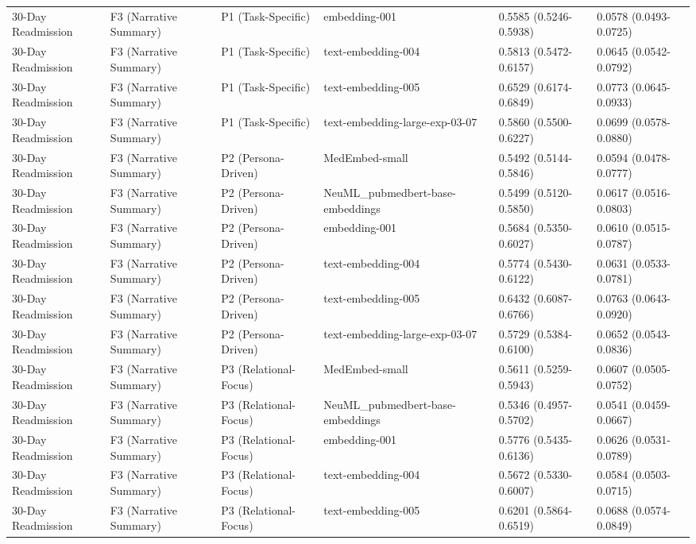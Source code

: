\begin{tabular}{llllll}
30-Day Readmission & F3 (Narrative Summary) & P1 (Task-Specific) & embedding-001 & 0.5585 (0.5246-0.5938) & 0.0578 (0.0493-0.0725) \\
30-Day Readmission & F3 (Narrative Summary) & P1 (Task-Specific) & text-embedding-004 & 0.5813 (0.5472-0.6157) & 0.0645 (0.0542-0.0792) \\
30-Day Readmission & F3 (Narrative Summary) & P1 (Task-Specific) & text-embedding-005 & 0.6529 (0.6174-0.6849) & 0.0773 (0.0645-0.0933) \\
30-Day Readmission & F3 (Narrative Summary) & P1 (Task-Specific) & text-embedding-large-exp-03-07 & 0.5860 (0.5500-0.6227) & 0.0699 (0.0578-0.0880) \\
30-Day Readmission & F3 (Narrative Summary) & P2 (Persona-Driven) & MedEmbed-small & 0.5492 (0.5144-0.5846) & 0.0594 (0.0478-0.0777) \\
30-Day Readmission & F3 (Narrative Summary) & P2 (Persona-Driven) & NeuML\_pubmedbert-base-embeddings & 0.5499 (0.5120-0.5850) & 0.0617 (0.0516-0.0803) \\
30-Day Readmission & F3 (Narrative Summary) & P2 (Persona-Driven) & embedding-001 & 0.5684 (0.5350-0.6027) & 0.0610 (0.0515-0.0787) \\
30-Day Readmission & F3 (Narrative Summary) & P2 (Persona-Driven) & text-embedding-004 & 0.5774 (0.5430-0.6122) & 0.0631 (0.0533-0.0781) \\
30-Day Readmission & F3 (Narrative Summary) & P2 (Persona-Driven) & text-embedding-005 & 0.6432 (0.6087-0.6766) & 0.0763 (0.0643-0.0920) \\
30-Day Readmission & F3 (Narrative Summary) & P2 (Persona-Driven) & text-embedding-large-exp-03-07 & 0.5729 (0.5384-0.6100) & 0.0652 (0.0543-0.0836) \\
30-Day Readmission & F3 (Narrative Summary) & P3 (Relational-Focus) & MedEmbed-small & 0.5611 (0.5259-0.5943) & 0.0607 (0.0505-0.0752) \\
30-Day Readmission & F3 (Narrative Summary) & P3 (Relational-Focus) & NeuML\_pubmedbert-base-embeddings & 0.5346 (0.4957-0.5702) & 0.0541 (0.0459-0.0667) \\
30-Day Readmission & F3 (Narrative Summary) & P3 (Relational-Focus) & embedding-001 & 0.5776 (0.5435-0.6136) & 0.0626 (0.0531-0.0789) \\
30-Day Readmission & F3 (Narrative Summary) & P3 (Relational-Focus) & text-embedding-004 & 0.5672 (0.5330-0.6007) & 0.0584 (0.0503-0.0715) \\
30-Day Readmission & F3 (Narrative Summary) & P3 (Relational-Focus) & text-embedding-005 & 0.6201 (0.5864-0.6519) & 0.0688 (0.0574-0.0849) \\

\end{tabular}
